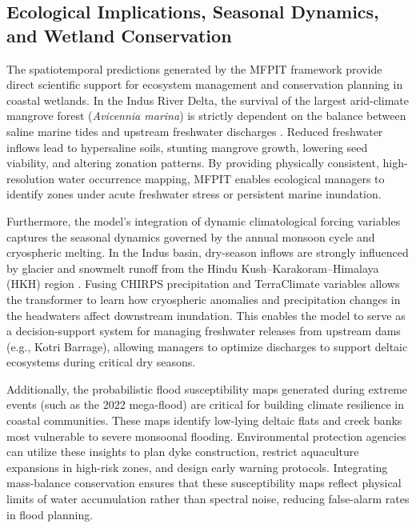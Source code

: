 \documentclass[preprint,12pt]{elsarticle}
\begin{document}
\subsection{Ecological Implications, Seasonal Dynamics, and Wetland Conservation}
The spatiotemporal predictions generated by the MFPIT framework provide direct scientific support for ecosystem management and conservation planning in coastal wetlands. In the Indus River Delta, the survival of the largest arid-climate mangrove forest (\textit{Avicennia marina}) is strictly dependent on the balance between saline marine tides and upstream freshwater discharges \cite{rehman_indus_2024}. Reduced freshwater inflows lead to hypersaline soils, stunting mangrove growth, lowering seed viability, and altering zonation patterns. By providing physically consistent, high-resolution water occurrence mapping, MFPIT enables ecological managers to identify zones under acute freshwater stress or persistent marine inundation. 

Furthermore, the model's integration of dynamic climatological forcing variables captures the seasonal dynamics governed by the annual monsoon cycle and cryospheric melting. In the Indus basin, dry-season inflows are strongly influenced by glacier and snowmelt runoff from the Hindu Kush--Karakoram--Himalaya (HKH) region \cite{immerzeel_science_2010, lutz_consistent_2014}. Fusing CHIRPS precipitation and TerraClimate variables allows the transformer to learn how cryospheric anomalies and precipitation changes in the headwaters affect downstream inundation. This enables the model to serve as a decision-support system for managing freshwater releases from upstream dams (e.g., Kotri Barrage), allowing managers to optimize discharges to support deltaic ecosystems during critical dry seasons.

Additionally, the probabilistic flood susceptibility maps generated during extreme events (such as the 2022 mega-flood) are critical for building climate resilience in coastal communities. These maps identify low-lying deltaic flats and creek banks most vulnerable to severe monsoonal flooding. Environmental protection agencies can utilize these insights to plan dyke construction, restrict aquaculture expansions in high-risk zones, and design early warning protocols. Integrating mass-balance conservation ensures that these susceptibility maps reflect physical limits of water accumulation rather than spectral noise, reducing false-alarm rates in flood planning.
\end{document}

